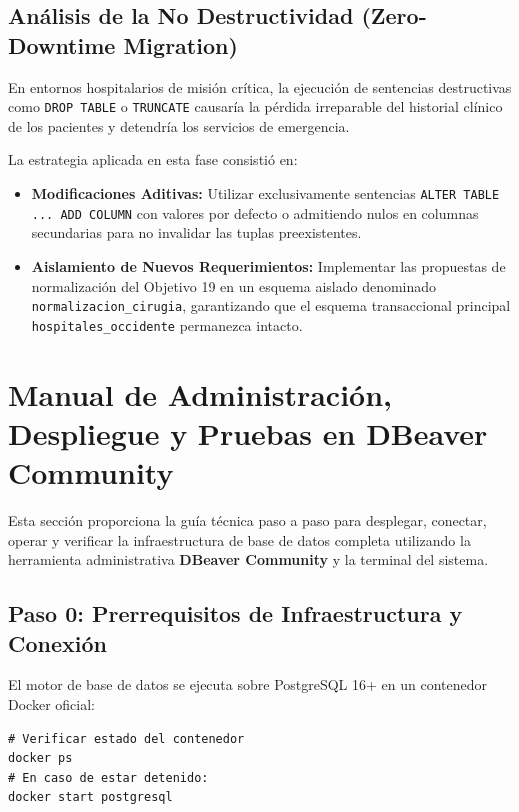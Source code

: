\documentclass[11pt,a4paper]{article}
\begin{document}
\subsection{Análisis de la No Destructividad (Zero-Downtime Migration)}
En entornos hospitalarios de misión crítica, la ejecución de sentencias destructivas como \texttt{DROP TABLE} o \texttt{TRUNCATE} causaría la pérdida irreparable del historial clínico de los pacientes y detendría los servicios de emergencia.

La estrategia aplicada en esta fase consistió en:
\begin{itemize}
	\item \textbf{Modificaciones Aditivas:} Utilizar exclusivamente sentencias \texttt{ALTER TABLE ... ADD COLUMN} con valores por defecto o admitiendo nulos en columnas secundarias para no invalidar las tuplas preexistentes.
	\item \textbf{Aislamiento de Nuevos Requerimientos:} Implementar las propuestas de normalización del Objetivo 19 en un esquema aislado denominado \texttt{normalizacion\_cirugia}, garantizando que el esquema transaccional principal \texttt{hospitales\_occidente} permanezca intacto.
\end{itemize}

\newpage

\section{Manual de Administración, Despliegue y Pruebas en DBeaver Community}
Esta sección proporciona la guía técnica paso a paso para desplegar, conectar, operar y verificar la infraestructura de base de datos completa utilizando la herramienta administrativa \textbf{DBeaver Community} y la terminal del sistema.

\subsection{Paso 0: Prerrequisitos de Infraestructura y Conexión}
El motor de base de datos se ejecuta sobre PostgreSQL 16+ en un contenedor Docker oficial:
\begin{lstlisting}[style=sqlstyle]
# Verificar estado del contenedor
docker ps
# En caso de estar detenido:
docker start postgresql
\end{lstlisting}
\end{document}
